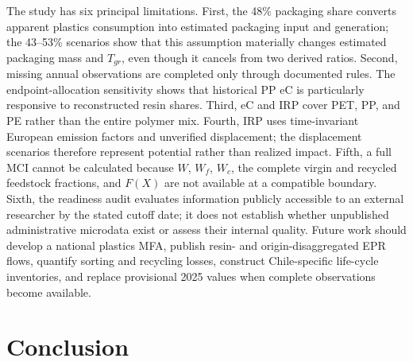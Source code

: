 \documentclass[review,10pt]{elsarticle}
\newcommand{\changepar}[1]{#1\par\medskip}
\begin{document}
\changepar{The study has six principal limitations. First, the 48\% packaging share converts apparent plastics consumption into estimated packaging input and generation; the 43--53\% scenarios show that this assumption materially changes estimated packaging mass and $T_{gr}$, even though it cancels from two derived ratios. Second, missing annual observations are completed only through documented rules. The endpoint-allocation sensitivity shows that historical PP eC is particularly responsive to reconstructed resin shares. Third, eC and IRP cover PET, PP, and PE rather than the entire polymer mix. Fourth, IRP uses time-invariant European emission factors and unverified displacement; the displacement scenarios therefore represent potential rather than realized impact. Fifth, a full MCI cannot be calculated because $W$, $W_f$, $W_c$, the complete virgin and recycled feedstock fractions, and $F(X)$ are not available at a compatible boundary. Sixth, the readiness audit evaluates information publicly accessible to an external researcher by the stated cutoff date; it does not establish whether unpublished administrative microdata exist or assess their internal quality. Future work should develop a national plastics MFA, publish resin- and origin-disaggregated EPR flows, quantify sorting and recycling losses, construct Chile-specific life-cycle inventories, and replace provisional 2025 values when complete observations become available.}

\section{Conclusion}
\end{document}
